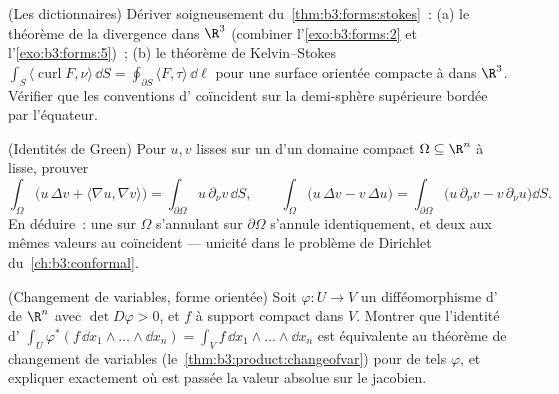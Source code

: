 \begin{exercise}[$\star\star$]\label{exo:b3:forms:7}
(Les dictionnaires) Dériver soigneusement
du~\cref{thm:b3:forms:stokes}~: (a) le théorème de la
divergence dans $\R^3$ (combiner l'\cref{exo:b3:forms:2}
et l'\cref{exo:b3:forms:5})~; (b) le théorème de
Kelvin--Stokes $\int_S\langle\operatorname{curl}F,
\nu\rangle\,\dd S = \oint_{\partial S}\langle F,
\tau\rangle\,\dd\ell$ pour une surface orientée compacte à
 dans $\R^3$. Vérifier que les conventions d'
coïncident sur la demi-sphère supérieure bordée par
l'équateur.
\end{exercise}

\begin{exercise}[$\star\star$]\label{exo:b3:forms:8}
(Identités de Green) Pour $u, v$ lisses sur un  d'un
domaine compact $\Omega \subseteq \R^n$ à  lisse,
prouver
\[
\int_\Omega\bigl(u\,\Delta v + \langle\nabla u, \nabla
v\rangle\bigr) = \int_{\partial\Omega}u\,\partial_\nu
v\,\dd S,
\qquad
\int_\Omega\bigl(u\,\Delta v - v\,\Delta u\bigr) =
\int_{\partial\Omega}\bigl(u\,\partial_\nu v -
v\,\partial_\nu u\bigr)\dd S .
\]
En déduire~: une  sur $\Omega$ s'annulant
sur $\partial\Omega$ s'annule identiquement, et deux
 aux mêmes valeurs au  coïncident
--- unicité dans le problème de Dirichlet
du~\cref{ch:b3:conformal}.
\end{exercise}

\begin{exercise}[$\star\star$]\label{exo:b3:forms:9}
(Changement de variables, forme orientée) Soit
$\varphi\colon U \to V$ un difféomorphisme d' de
$\R^n$ avec $\det D\varphi > 0$, et $f$  à support
compact dans $V$. Montrer que l'identité d'
$\int_U\varphi^*(f\,\dd x_1\wedge\dots\wedge\dd x_n) =
\int_Vf\,\dd x_1\wedge\dots\wedge\dd x_n$ est équivalente au
théorème de changement de variables
(le~\cref{thm:b3:product:changeofvar}) pour de tels $\varphi$,
et expliquer exactement où est passée la valeur absolue sur
le jacobien.
\end{exercise}

